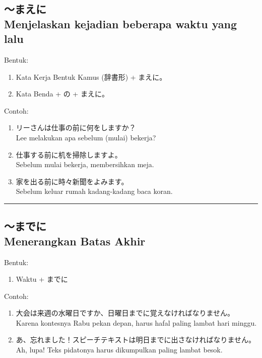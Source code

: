 \subsection*{
    ～まえに \\
    Menjelaskan kejadian beberapa waktu yang lalu
}
Bentuk:
\begin{enumerate}
    \item Kata Kerja Bentuk Kamus (辞書形) + まえに。
    \item Kata Benda + の + まえに。
\end{enumerate}
Contoh: 
\begin{enumerate}
    \item リーさんは仕事の前に何をしますか？
    \\ Lee melakukan apa sebelum (mulai) bekerja?
    \item 仕事する前に机を掃除しますよ。
    \\ Sebelum mulai bekerja, membersihkan meja.
    \item 家を出る前に時々新聞をよみます。
    \\ Sebelum keluar rumah kadang-kadang baca koran.
\end{enumerate}

\vspace{0.2cm}\hrule height 1pt\vspace{0.2cm}

\newpage
\subsection*{
    ～までに \\
    Menerangkan Batas Akhir
}
Bentuk:
\begin{enumerate}
    \item Waktu + までに
\end{enumerate}
Contoh: 
\begin{enumerate}
    \item 大会は来週の水曜日ですか、日曜日までに覚えなければなりません。
    \\ Karena kontesnya Rabu pekan depan, harus hafal paling lambat hari minggu.
    \item あ、忘れました！スピーチテキストは明日までに出さなければなりません。
    \\ Ah, lupa! Teks pidatonya harus dikumpulkan paling lambat besok.
\end{enumerate}

